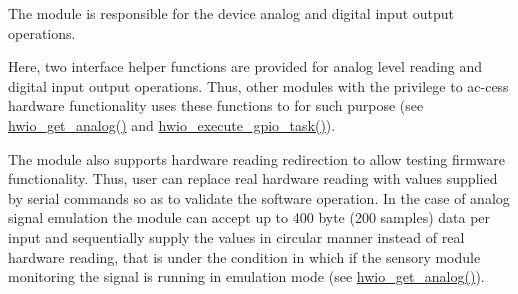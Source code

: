 The module is responsible for the device analog and digital input output operations.

Here, two interface helper functions are provided for analog level reading and digital input output operations. Thus, other modules with the privilege to ac-\/cess hardware functionality uses these functions to for such purpose (see \hyperlink{a00056_a1327cee26589588e02e03453f3cc7871}{hwio\+\_\+get\+\_\+analog()} and \hyperlink{a00056_a0af9eae455fbdf4e77def5bfffa109cb}{hwio\+\_\+execute\+\_\+gpio\+\_\+task()}).

The module also supports hardware reading redirection to allow testing firmware functionality. Thus, user can replace real hardware reading with values supplied by serial commands so as to validate the software operation. In the case of analog signal emulation the module can accept up to 400 byte (200 samples) data per input and sequentially supply the values in circular manner instead of real hardware reading, that is under the condition in which if the sensory module monitoring the signal is running in emulation mode (see \hyperlink{a00056_a1327cee26589588e02e03453f3cc7871}{hwio\+\_\+get\+\_\+analog()}). 